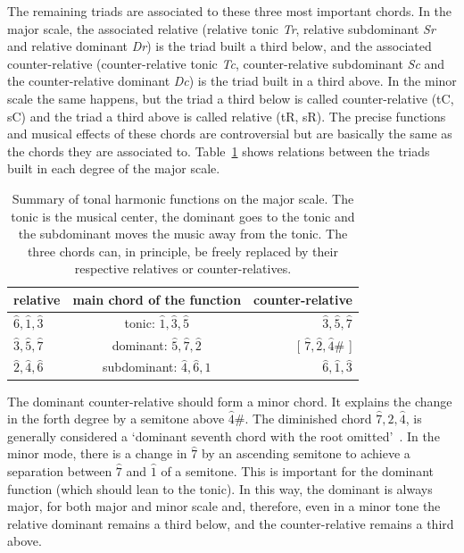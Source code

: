 The remaining triads are associated to these three most important chords. In the major scale, the associated relative (relative tonic \textit{Tr}, relative
subdominant \textit{Sr} and relative dominant \textit{Dr}) is the triad built a third below, and the associated counter-relative (counter-relative tonic \textit{Tc}, counter-relative subdominant \textit{Sc} and the counter-relative dominant \textit{Dc}) is the triad built in a third above. In the minor scale the same happens, but the triad a third below is called counter-relative (tC, sC) and the triad a third above is called relative (tR,
sR). The precise functions and musical effects of these chords are
controversial but are basically the same as the chords they are associated to. Table~\ref{tab:harmonia} shows relations between the triads built in each degree of the major scale.

\begin{table}[htp!]
\centering
\caption{Summary of tonal harmonic functions on the major scale.
	The tonic is the musical center, the dominant goes to the tonic and the subdominant moves the music away from
the tonic. The three chords can, in principle, be freely replaced by their
respective relatives or counter-relatives.}
\begin{tabular}{l | c | r}
relative & main chord of the function & counter-relative \\\hline\hline
$\hat{6},\hat{1},\hat{3}$ & tonic:       $\hat{1},\hat{3},\hat{5}$ & $\hat{3}, \hat{5},      \hat{7}$ \\
$\hat{3},\hat{5},\hat{7}$ & dominant:    $\hat{5},\hat{7},\hat{2}$ & [ $\hat{7},\hat{2},\hat{4}\#$ ] \\
$\hat{2},\hat{4},\hat{6}$ & subdominant: $\hat{4},\hat{6},\hat{1}$ & $\hat{6},\hat{1},       \hat{3}$
\end{tabular}
\label{tab:harmonia}
\end{table}

The dominant counter-relative should form a minor chord. It explains the change in the forth degree by a semitone above $\hat{4}\#$. The diminished chord
$\hat{7},\hat{2},\hat{4}$, is generally considered a `dominant seventh chord with the root omitted'~\cite{Koellheuteur}.
In the minor mode, there is a change in $\hat{7}$ by an ascending semitone to achieve a separation between $\hat{7}$ and $\hat{1}$ of a semitone. This is important for the dominant function (which should lean to the tonic). In this way, the dominant is always major, for both major and minor scale and, therefore, even in a minor tone the relative dominant remains a third below, and the counter-relative remains a third above.

